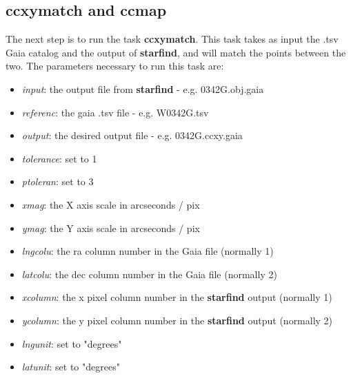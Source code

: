 \documentclass[a4paper]{article}
\begin{document}
\subsection{ccxymatch and ccmap}
The next step is to run the task \textbf{ccxymatch}.  This task takes as input the .tsv Gaia catalog and the output of \textbf{starfind}, and will match the points between the two.  The parameters necessary to run this task are: \\
\begin{itemize}
    \item \textit{input}: the output file from \textbf{starfind} - e.g. 0342G.obj.gaia
    \item \textit{referenc}: the gaia .tsv file - e.g. W0342G.tsv
    \item \textit{output}: the desired output file - e.g. 0342G.ccxy.gaia
    \item \textit{tolerance}: set to 1
    \item \textit{ptoleran}: set to 3
    \item \textit{xmag}: the X axis scale in arcseconds / pix
    \item \textit{ymag}: the Y axis scale in arcseconds / pix
    \item \textit{lngcolu}: the ra column number in the Gaia file (normally 1)
    \item \textit{latcolu}: the dec column number in the Gaia file (normally 2)
    \item \textit{xcolumn}: the x pixel column number in the \textbf{starfind} output (normally 1)
    \item \textit{ycolumn}: the y pixel column number in the \textbf{starfind} output (normally 2)
    \item \textit{lngunit}: set to "degrees"
    \item \textit{latunit}: set to "degrees"
\end{itemize}
\end{document}

